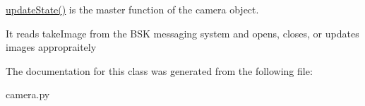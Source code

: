 \hyperlink{classcamera_1_1camera_afd4c4aea63d44aa43d53ccd4110be3a8}{update\+State()} is the master function of the camera object. 

It reads take\+Image from the B\+SK messaging system and opens, closes, or updates images appropraitely 

The documentation for this class was generated from the following file\+:\begin{DoxyCompactItemize}
\item 
camera.\+py\end{DoxyCompactItemize}
